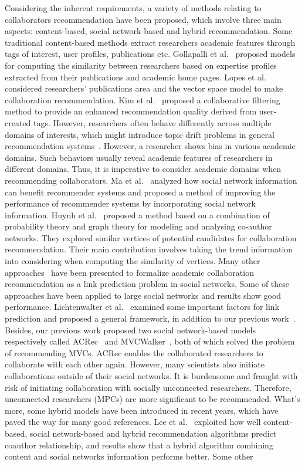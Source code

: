 \documentclass[10pt,letterpaper]{article}
\begin{document}
Considering the inherent requirements, a variety of methods relating to collaborators recommendation have been proposed, which involve three main aspects: content-based, social network-based and hybrid recommendation. Some traditional content-based methods extract researchers academic features through tags of interest, user profiles, publications etc. Gollapalli et al.~\cite{gollapalli2012similar} proposed models for computing the similarity between researchers based on expertise profiles extracted from their publications and academic home pages. Lopes et al.~\cite{lopes2010collaboration} considered researchers' publications area and the vector space model to make collaboration recommendation. Kim et al.~\cite{kim2010collaborative} proposed a collaborative filtering method to provide an enhanced recommendation quality derived from user-created tags. However, researchers often behave differently across multiple domains of interests, which might introduce topic drift problems in general recommendation systems~\cite{tang2012cross}. However, a researcher shows bias in various academic domains. Such behaviors usually reveal academic features of researchers in different domains. Thus, it is imperative to consider academic domains when recommending collaborators. Ma et al.~\cite{ma2011recommender} analyzed how social network information can benefit recommender systems and proposed a method of improving the performance of recommender systems by incorporating social network information. Huynh et al.~\cite{huynh2013trend} proposed a method based on a combination of probability theory and graph theory for modeling and analysing co-author networks. They explored similar vertices of potential candidates for collaboration recommendation. Their main contribution involves taking the trend information into considering when computing the similarity of vertices. Many other approaches~\cite{chen2012discovering,sun2011co} have been presented to formalize academic collaboration recommendation as a link prediction problem in social networks. Some of these approaches have been applied to large social networks and results show good performance. Lichtenwalter et al.~\cite{lichtenwalter2010new} examined some important factors for link prediction and proposed a general framework, in addition to our previous work~\cite{li2014acrec,xia2014mvcwalker}. Besides, our previous work proposed two social network-based models respectively called ACRec~\cite{li2014acrec} and MVCWalker~\cite{xia2014mvcwalker}, both of which solved the problem of recommending MVCs. ACRec enables the collaborated researchers to collaborate with each other again. However, many scientists also initiate collaborations outside of their social networks. It is burdensome and fraught with risk of initiating collaboration with socially unconnected researchers. Therefore, unconnected researchers (MPCs) are more significant to be recommended. What's more, some hybrid models have been introduced in recent years, which have paved the way for many good references. Lee et al.~\cite{lee2011recommending} exploited how well content-based, social network-based and hybrid recommendation algorithms predict coauthor relationship, and results show that a hybrid algorithm combining content and social networks information performs better. Some other 
\end{document}
